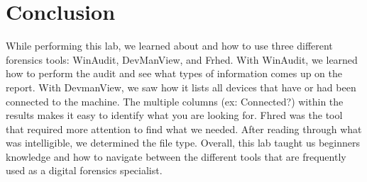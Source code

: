 \section{Conclusion}
While performing this lab, we learned about and how to use three different forensics tools: WinAudit, DevManView, and Frhed.
With WinAudit, we learned how to perform the audit and see what types of information comes up on the report.
With DevmanView, we saw how it lists all devices that have or had been connected to the machine.
The multiple columns (ex: Connected?) within the results makes it easy to identify what you are looking for.
Fhred was the tool that required more attention to find what we needed.
After reading through what was intelligible, we determined the file type.
Overall, this lab taught us beginners knowledge and how to navigate between the different tools that are frequently used as a digital forensics specialist.